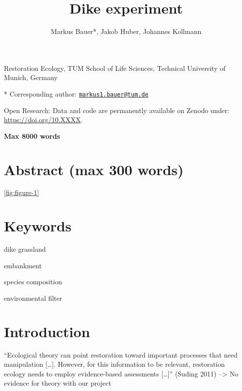 \documentclass[
]{article}
\title{Dike experiment}
\author{Markus Bauer*, Jakob Huber, Johannes Kollmann}
\date{}
\begin{document}
\maketitle

{
\setcounter{tocdepth}{2}
\tableofcontents
}
Restoration Ecology, TUM School of Life Sciences, Technical University of Munich, Germany

* Corresponding author: \href{mailto:markus1.bauer@tum.de}{\nolinkurl{markus1.bauer@tum.de}}

Open Research: Data and code are permanently available on Zenodo under: \url{https://doi.org/10.XXXX}.

\textbf{Max 8000 words}

\clearpage

\newpage

\hypertarget{abstract-max-300-words}{%
\section*{Abstract (max 300 words)}\label{abstract-max-300-words}}

\ref{fig:figure-1}

\hypertarget{keywords}{%
\section*{Keywords}\label{keywords}}

dike grassland

embankment

species composition

environmental filter

\clearpage

\newpage

\hypertarget{introduction}{%
\section{Introduction}\label{introduction}}

``Ecological theory can point restoration toward important processes that need manipulation {[}\ldots{]}. However, for this information to be relevant, restoration ecology needs to employ evidence-based assessments {[}\ldots{]}'' (Suding 2011) --\textgreater{} No evidence for theory with our project
\end{document}
